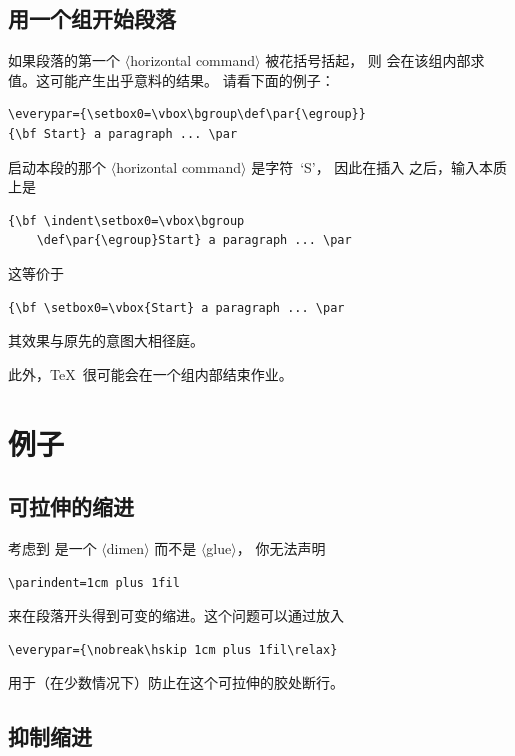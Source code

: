 \documentclass[a4paper]{rapport3}
\def\gr#1{$\langle$#1$\rangle$}\def\key#1{{\tt#1}}
\def\alt{}\def\altt{}%
\def\gram#1{\gr{#1}}%
\begin{document}
\subsection{用一个组开始段落}

如果段落的第一个 \gram{horizontal command} 被花括号括起，
则  会在该组内部求值。这可能产生出乎意料的结果。
请看下面的例子：
\begin{verbatim}
\everypar={\setbox0=\vbox\bgroup\def\par{\egroup}}
{\bf Start} a paragraph ... \par
\end{verbatim}
启动本段的那个 \gr{horizontal command} 是字符~`S'，
因此在插入  之后，输入本质上是
\begin{verbatim}
{\bf \indent\setbox0=\vbox\bgroup
    \def\par{\egroup}Start} a paragraph ... \par
\end{verbatim}
这等价于
\begin{verbatim}
{\bf \setbox0=\vbox{Start} a paragraph ... \par
\end{verbatim}
其效果与原先的意图大相径庭。
\alt
此外，\TeX\ 很可能会在一个组内部结束作业。

\section{例子}

\subsection{可拉伸的缩进}

考虑到  是一个 \gram{dimen} 而不是 \gram{glue}，
你无法声明
\begin{verbatim}
\parindent=1cm plus 1fil
\end{verbatim}
来在段落开头得到可变的缩进。这个问题可以通过放入
\begin{verbatim}
\everypar={\nobreak\hskip 1cm plus 1fil\relax}
\end{verbatim}
 用于（在少数情况下）防止在这个可拉伸的胶处断行。

\subsection{抑制缩进}
\end{document}
